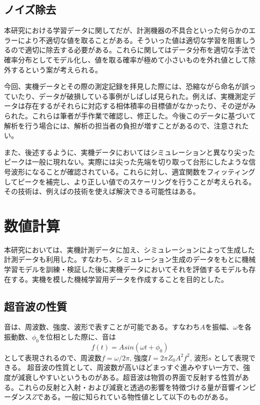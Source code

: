 \documentclass[uplatex]{suribt}
\begin{document}
\section{ノイズ除去}
本研究における学習データに関してだが、計測機器の不具合といった何らかのエラーにより不適切な値を取ることがある。そういった値は適切な学習を阻害しうるので適切に除去する必要がある。これらに関してはデータ分布を適切な手法で確率分布としてモデル化し、値を取る確率が極めて小さいものを外れ値として除外するという案が考えられる。\par
今回、実機データとその際の測定記録を拝見した際には、恐縮ながら命名が誤っていたり、データが破損している事例がしばしば見られた。例えば、実機測定データは存在するがそれらに対応する相体積率の目標値がなかったり、その逆がみられた。これらは筆者が手作業で確認し、修正した。今後このデータに基づいて解析を行う場合には、解析の担当者の負担が増すことがあるので、注意されたい。\par
また、後述するように、実機データにおいてはシミュレーションと異なり尖ったピークは一般に現れない。実際には尖った先端を切り取って台形にしたような信号波形になることが確認されている。これらに対し、適宜関数をフィッティングしてピークを補完し、より正しい値でのスケーリングを行うことが考えられる。その技術は、例えば\cite{kyodaisenpai}の技術を使えば解決できる可能性はある。
\chapter{数値計算}
本研究においては、実機計測データに加え、シミュレーションによって生成した計測データも利用した。すなわち、シミュレーション生成のデータをもとに機械学習モデルを訓練・検証した後に実機データにおいてそれを評価するモデルも存在する。実機を模した機械学習用データを作成することを目的とした。
\section{超音波の性質}
音は、周波数、強度、波形で表すことが可能である。すなわち$A$を振幅、$\omega$を各振動数、$\phi_0$を位相とした際に、音は 
\begin{equation}
    f(t)=Asin(\omega t +\phi_0)
\end{equation}
として表現されるので、周波数$f=\omega /2\pi$, 強度$I=2\pi Z_0 A^2f^2$, 波形$s$
として表現できる。  
超音波の性質として、周波数が高いほどまっすぐ進みやすい一方で、強度が減衰しやすいというものがある。超音波は物質の界面で反射する性質がある。これらの反射と入射・および減衰と透過の影響を特徴づける量が音響インピーダンス$Z$である。一般に知られている物性値として以下のものがある。
\end{document}
